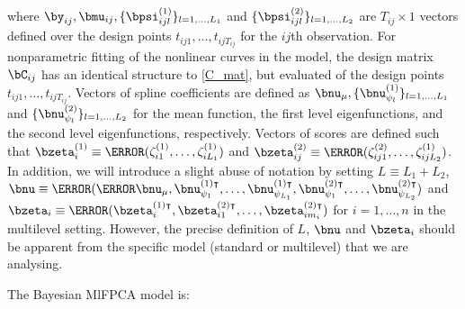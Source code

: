 \documentclass[ba]{imsart}
\numberwithin{equation}{section}
\theoremstyle{plain}
\def\numu{\bnu_\mu}
\newcommand\zetaL[2]{\zeta^{(#1)}_{#2}}
\newcommand\bzetaL[2]{\bzeta^{(#1)}_{#2}}
\newcommand\bzetaTL[2]{\bzeta^{(#1) \intercal}_{#2}}
\newcommand\bpsiL[2]{\bpsi^{(#1)}_{#2}}
\newcommand\nupsiL[2]{\bnu^{(#1)}_{\psi_{#2}}}
\newcommand\nupsiTL[2]{\bnu^{(#1) \intercal}_{\psi_{#2}}}
\begin{document}
\noindent where $\by_{ij}, \bmu_{ij}, \{ \bpsiL{1}{ijl} \}_{l = 1, \dots, L_1}$ and $\{ \bpsiL{2}{ijl} \}_{l = 1, \dots, L_2}$
are $T_{ij} \times 1$ vectors defined over the design points $t_{ij1}, \dots, t_{ijT_{ij}}$ for the $ij$th observation.
For nonparametric fitting of the nonlinear curves in the model, the design matrix $\bC_{ij}$ has an identical
structure to \eqref{C_mat}, but evaluated of the design points $t_{ij1}, \dots, t_{ijT_{ij}}$. Vectors of spline
coefficients are defined as $\numu, \{ \nupsiL{1}{l} \}_{l = 1, \dots, L_1}$ and $\{ \nupsiL{2}{l} \}_{l = 1, \dots, L_2}$
for the mean function, the first level eigenfunctions, and the second level eigenfunctions, respectively.
Vectors of scores are defined such that $\bzetaL{1}{i} \equiv \T{(\zetaL{1}{i1}, \dots, \zetaL{1}{iL_1})}$ and
$\bzetaL{2}{ij} \equiv \T{(\zetaL{2}{ij1}, \dots, \zetaL{1}{ijL_2})}$. In addition, we will introduce a slight abuse
of notation by setting $L \equiv L_1 + L_2$,
$\bnu \equiv \T{(\T{\numu}, \nupsiTL{1}{1}, \dots, \nupsiTL{1}{L_1}, \nupsiTL{2}{1}, \dots, \nupsiTL{2}{L_2})}$
and $\bzeta_i \equiv \T{(\bzetaTL{1}{i}, \bzetaTL{2}{i1}, \dots, \bzetaTL{2}{im_i})}$ for $i = 1, \dots, n$
in the multilevel setting. However, the precise definition of $L$, $\bnu$ and $\bzeta_i$ should be apparent from
the specific model (standard or multilevel) that we are analysing.


The Bayesian MlFPCA model is:
\end{document}
